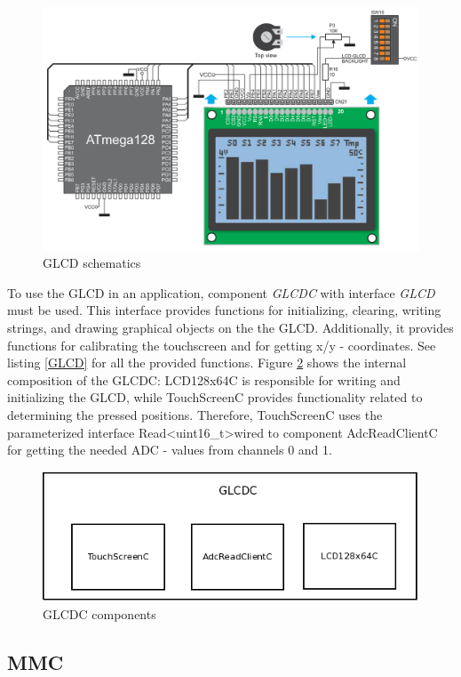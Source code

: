 \begin{figure}[h]
 \centerline{\includegraphics[width=.8\columnwidth]{pics/GLCD.png}}
  \caption{GLCD schematics}
  \label{fig:glcd}
\end{figure}

To use the GLCD in an application, component \textit{GLCDC} with interface \textit{GLCD} must be used. This interface provides functions for initializing, clearing, writing strings, and drawing graphical objects on the the GLCD. Additionally, it provides functions for calibrating the touchscreen and for getting x/y - coordinates. See listing \ref{GLCD} for all the provided functions. Figure \ref{fig:glcdc} shows the internal composition of the GLCDC: LCD128x64C is responsible for writing and initializing the GLCD, while TouchScreenC provides functionality related to determining the pressed positions. Therefore, TouchScreenC uses the parameterized interface Read\textless uint16\_t\textgreater wired to component AdcReadClientC for getting the needed ADC - values from channels 0 and 1.



\begin{figure}[h]
 \centerline{\includegraphics[width=.8\columnwidth]{pics/GLCDC.png}}
  \caption{GLCDC components}
  \label{fig:glcdc}
\end{figure}


\subsection{MMC}

